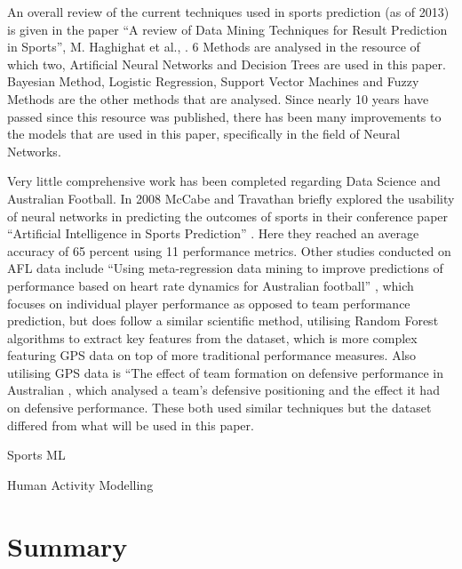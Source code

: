 \documentclass{imc-inf}
\begin{document}
	An overall review of the current techniques used in sports prediction (as of 2013) is given in the paper “A review of Data Mining Techniques for Result Prediction in Sports”, M. Haghighat et al., \cite{ResearchGate}. 6 Methods are analysed in the resource of which two, Artificial Neural Networks and Decision Trees are used in this paper. Bayesian Method, Logistic Regression, Support Vector Machines and Fuzzy Methods are the other methods that are analysed. Since nearly 10 years have passed since this resource was published, there has been many improvements to the models that are used in this paper, specifically in the field of Neural Networks. 
	
	Very little comprehensive work has been completed regarding Data Science and Australian Football. In 2008 McCabe and Travathan briefly explored the usability of neural networks in predicting the outcomes of sports in their conference paper “Artificial Intelligence in Sports Prediction” \cite{AFL_1}. Here they reached an average accuracy of 65 percent using 11 performance metrics. Other studies conducted on AFL data include “Using meta-regression data mining to improve predictions of performance based on heart rate dynamics for Australian football” \cite{AFL_2}, which focuses on individual player performance as opposed to team performance prediction, but does follow a similar scientific method, utilising Random Forest algorithms to extract key features from the dataset, which is more complex featuring GPS data on top of more traditional performance measures. Also utilising GPS data is “The effect of team formation on defensive performance in Australian \cite{AFL_3}, which analysed a team’s defensive positioning and the effect it had on defensive performance. These both used similar techniques but the dataset differed from what will be used in this paper.
	
	Sports ML \cite{BUNKER201927}
	
	Human Activity Modelling \cite{10.1145/3316782.3322781}
	
	\newpage
	\chapter{Summary}\label{chap:summary}
\end{document}
